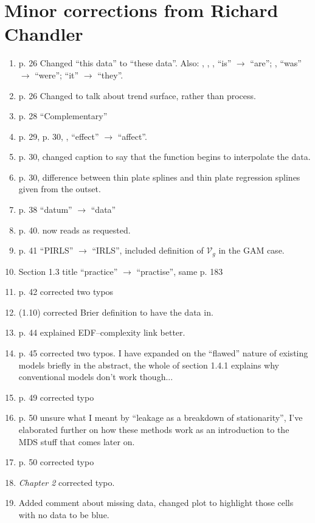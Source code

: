 \section{Minor corrections from Richard Chandler}
\label{richard}

\begin{enumerate}
\item p. 26 Changed ``this data'' to ``these data''. Also: , , ,  ``is'' $\rightarrow$ ``are''; ,  ``was'' $\rightarrow$ ``were'';  ``it'' $\rightarrow$ ``they''.
\item p. 26 Changed to talk about trend surface, rather than process.
\item p. 28 ``Complementary''
\item p. 29, p. 30, ,  ``effect'' $\rightarrow$ ``affect''.
\item p. 30, changed caption to say that the function begins to interpolate the data.
\item p. 30, difference between thin plate splines and thin plate regression splines given from the outset.
\item p. 38 ``datum'' $\rightarrow$ ``data''
\item p. 40. now reads as requested.
\item p. 41 ``PIRLS'' $\rightarrow$ ``IRLS'', included definition of $\mathcal{V}_g$ in the GAM case.
\item Section 1.3 title ``practice'' $\rightarrow$ ``practise'', same p. 183
\item p. 42 corrected two typos
\item (1.10) corrected Brier definition to have the data in.
\item p. 44 explained EDF--complexity link better.
\item p. 45 corrected two typos. I have expanded on the ``flawed'' nature of existing models briefly in the abstract, the whole of section 1.4.1 explains why conventional models don't work though...
\item p. 49 corrected typo
\item p. 50 unsure what I meant by ``leakage as a breakdown of stationarity'', I've elaborated further on how these methods work as an introduction to the MDS stuff that comes later on.
\item p. 50 corrected typo
\item \textit{Chapter 2}  corrected typo.
\item {} Added comment about missing data, changed plot to highlight those cells with no data to be blue.

\end{enumerate}
